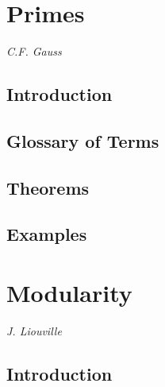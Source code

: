 \documentclass[12pt]{article}
\begin{document}
\section{Primes} %

\setcounter{equation}{0}
\setcounter{theorem}{0}

\begin{center}
{\it C.F. Gauss} %
\end{center}

\subsection{Introduction}

\subsection{Glossary of Terms}

\subsection{Theorems}

\subsection{Examples}


\section{Modularity} %

\setcounter{equation}{0}
\setcounter{theorem}{0}


\begin{center}

{\it J. Liouville} %

\end{center}

\subsection{Introduction}
\end{document}
